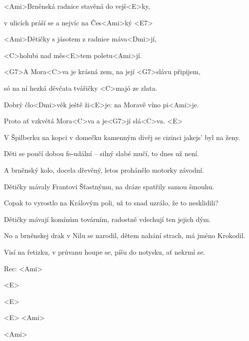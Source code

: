 

\zs
<Ami>Brněnská radnice stavěná do vejš<E>ky,

v ulicích práší se a nejvíc na Čes<Ami>ký <E7>

<Ami>Dětičky s jásotem z radnice máva<Dmi>jí,

<C>holubi nad měs<E>tem poletu<Ami>jí.
\ks

\zr
<G7>A Mora<C>va je krásná zem, na její <G7>slávu připijem,

só na ní hezká děvčata tvářičky <C>majó ze zlata.

Dobrý člo<Dmi>věk ještě ži<E>je: na Moravě víno pi<Ami>je.

Proto ať vzkvétá Mora<C>va a je<G7>jí slá<C>va. <E>
\kr

\zs
V Špilberku na kopci v domečku kamenným divěj se cizinci jakejs' byl na ženy.

Děti se poučí dobou fe-udální -- silný slabé mučí, to dnes už není.
\ks

\zr\kr

\zs
A brněnský kolo, docela dřevěný, letos prohánělo motorky závodní.

Dětičky mávaly Frantovi Šťastnýmu, na dráze spatřily samou šmouhu.
\ks

\zr\kr

\zs
Copak to vyrostlo na Královým poli, už to snad uzrálo, že to nesklidili?

Dětičky mávají komínům továrním, radostně vdechují ten jejich dým.
\ks

\zr\kr

\zs
No a brněnskej drak v Nilu se narodil, dětem nahání strach, má jméno Krokodil.

Visí na řetizku, v průvanu houpe se, píšu do notysku, ať nekrmí se.
\ks

\zr\kr

Rec: <Ami> 

<E> 

<E> 

<E> <Ami> 

<Ami> 


\zr\kr

\kp
